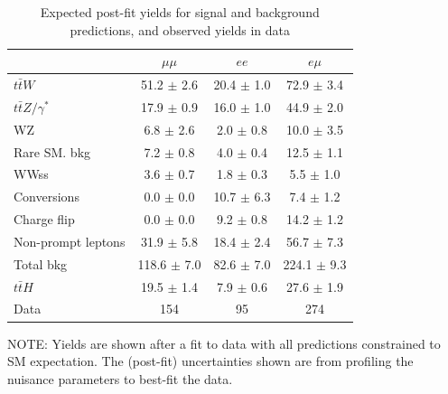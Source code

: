 \begin{table}[htbp]
  \begin{center}
    \caption[SIGNAL REGION POST-FIT EVENT YIELDS]{Expected post-fit yields 
      for signal and background predictions, and observed yields in data}
    \begin{tabular}{l c c c} \hline
      & $\mu\mu$ & $ee$ & $e\mu$  \\ \hline 
      $t\bar{t}W$ & 51.2 $\pm$ 2.6 & 20.4 $\pm$ 1.0 & 72.9 $\pm$ 3.4 \\
      $t\bar{t}Z/\gamma^{*}$ & 17.9 $\pm$ 0.9 & 16.0 $\pm$ 1.0 & 44.9 $\pm$ 2.0 \\
      \hline
      WZ & 6.8 $\pm$ 2.6 & 2.0 $\pm$ 0.8 & 10.0 $\pm$ 3.5 \\
      Rare SM. bkg & 7.2 $\pm$ 0.8 & 4.0 $\pm$ 0.4 & 12.5 $\pm$ 1.1 \\
      WWss & 3.6 $\pm$ 0.7 & 1.8 $\pm$ 0.3 & 5.5 $\pm$ 1.0 \\
      \hline
      Conversions & 0.0 $\pm$ 0.0 & 10.7 $\pm$ 6.3 & 7.4 $\pm$ 1.2 \\
      Charge flip & 0.0 $\pm$ 0.0 & 9.2 $\pm$ 0.8 & 14.2 $\pm$ 1.2 \\
      Non-prompt leptons & 31.9 $\pm$ 5.8 & 18.4 $\pm$ 2.4 & 56.7 $\pm$ 7.3 \\
      \hline
      Total bkg & 118.6 $\pm$ 7.0 & 82.6 $\pm$ 7.0 & 224.1 $\pm$ 9.3 \\
      \hline
      $t\bar{t}H$ & 19.5 $\pm$ 1.4 & 7.9 $\pm$ 0.6 & 27.6 $\pm$ 1.9 \\
      \hline
      Data & 154 & 95 & 274 \\
      \hline
    \end{tabular}
    \label{tab:postfit_yields}
    \begin{tablenotes}
      \small
      \item NOTE: Yields are shown after a fit to data with all predictions constrained to SM expectation. The (post-fit) uncertainties shown are from profiling the nuisance parameters to best-fit the data.
    \end{tablenotes}
  \end{center}
\end{table}

